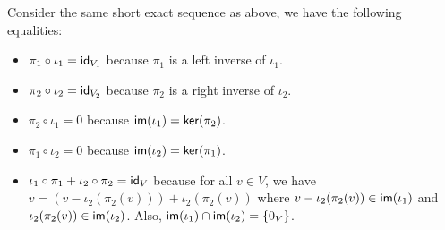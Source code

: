 Consider the same short exact sequence as above, we have the following equalities:
\begin{itemize}
  \item $\pi_1 \circ \iota_1 = \id_{V_1}$ because $\pi_1$ is a left inverse of $\iota_1$.
  \item $\pi_2 \circ \iota_2 = \id_{V_2}$ because $\pi_2$ is a right inverse of $\iota_2$.
  \item $\pi_2 \circ \iota_1 = 0$ because $\im(\iota_1) = \ker(\pi_2)$.
  \item $\pi_1 \circ \iota_2 = 0$ because $\im(\iota_2) = \ker(\pi_1)$.
  \item $\iota_1 \circ \pi_1 + \iota_2 \circ \pi_2 = \id_V$ because for all $v \in V$, we have $v = (v - \iota_2(\pi_2(v))) + \iota_2(\pi_2(v))$ where $v - \iota_2(\pi_2(v)) \in \im(\iota_1)$ and $\iota_2(\pi_2(v)) \in \im(\iota_2)$. Also, $\im(\iota_1) \cap \im(\iota_2) = \{0_V\}$.
\end{itemize}

